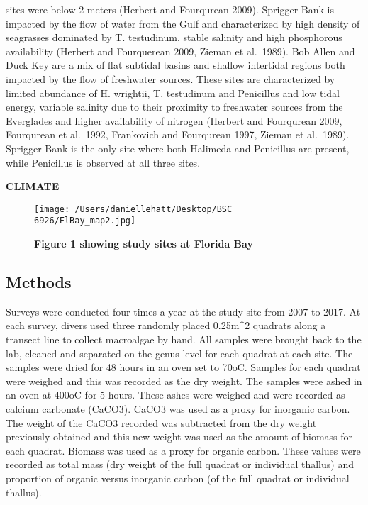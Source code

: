 \documentclass[]{article}
\begin{document}
sites were below 2 meters (Herbert and Fourqurean 2009). Sprigger Bank
is impacted by the flow of water from the Gulf and characterized by high
density of seagrasses dominated by T. testudinum, stable salinity and
high phosphorous availability (Herbert and Fourquerean 2009, Zieman et
al.~1989). Bob Allen and Duck Key are a mix of flat subtidal basins and
shallow intertidal regions both impacted by the flow of freshwater
sources. These sites are characterized by limited abundance of H.
wrightii, T. testudinum and Penicillus and low tidal energy, variable
salinity due to their proximity to freshwater sources from the
Everglades and higher availability of nitrogen (Herbert and Fourqurean
2009, Fourqurean et al.~1992, Frankovich and Fourqurean 1997, Zieman et
al.~1989). Sprigger Bank is the only site where both Halimeda and
Penicillus are present, while Penicillus is observed at all three sites.

\textbf{CLIMATE}

\begin{figure}
\centering
\texttt{[image: /Users/daniellehatt/Desktop/BSC 6926/FlBay\_map2.jpg]}
\caption{\textbf{Figure 1 showing study sites at Florida Bay}}
\end{figure}

\hypertarget{methods-1}{%
\subsection{Methods}\label{methods-1}}

Surveys were conducted four times a year at the study site from 2007 to
2017. At each survey, divers used three randomly placed 0.25m\^{}2
quadrats along a transect line to collect macroalgae by hand. All
samples were brought back to the lab, cleaned and separated on the genus
level for each quadrat at each site. The samples were dried for 48 hours
in an oven set to 70oC. Samples for each quadrat were weighed and this
was recorded as the dry weight. The samples were ashed in an oven at
400oC for 5 hours. These ashes were weighed and were recorded as calcium
carbonate (CaCO3). CaCO3 was used as a proxy for inorganic carbon. The
weight of the CaCO3 recorded was subtracted from the dry weight
previously obtained and this new weight was used as the amount of
biomass for each quadrat. Biomass was used as a proxy for organic
carbon. These values were recorded as total mass (dry weight of the full
quadrat or individual thallus) and proportion of organic versus
inorganic carbon (of the full quadrat or individual thallus).
\end{document}
